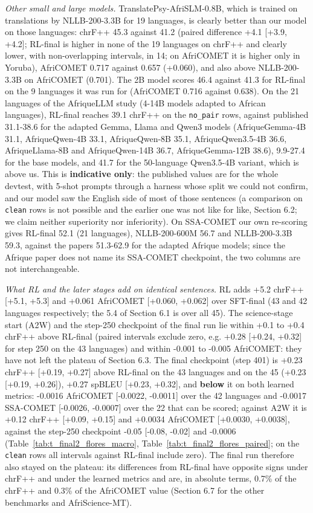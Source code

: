 \emph{Other small and large models.} TranslatePsy-AfriSLM-0.8B, which is trained on translations by NLLB-200-3.3B for 19 languages, is clearly better than our model on those languages: chrF++ 45.3 against 41.2 (paired difference +4.1 {[}+3.9, +4.2{]}; RL-final is higher in none of the 19 languages on chrF++ and clearly lower, with non-overlapping intervals, in 14; on AfriCOMET it is higher only in Yoruba), AfriCOMET 0.717 against 0.657 (+0.060), and also above NLLB-200-3.3B on AfriCOMET (0.701). The 2B model scores 46.4 against 41.3 for RL-final on the 9 languages it was run for (AfriCOMET 0.716 against 0.638). On the 21 languages of the AfriqueLLM study (4-14B models adapted to African languages), RL-final reaches 39.1 chrF++ on the \texttt{no\_pair} rows, against published 31.1-38.6 for the adapted Gemma, Llama and Qwen3 models (AfriqueGemma-4B 31.1, AfriqueQwen-4B 33.1, AfriqueQwen-8B 35.1, AfriqueQwen3.5-4B 36.6, AfriqueLlama-8B and AfriqueQwen-14B 36.7, AfriqueGemma-12B 38.6), 9.9-27.4 for the base models, and 41.7 for the 50-language Qwen3.5-4B variant, which is above us. This is \textbf{indicative only}: the published values are for the whole devtest, with 5-shot prompts through a harness whose split we could not confirm, and our model saw the English side of most of those sentences (a comparison on \texttt{clean} rows is not possible and the earlier one was not like for like, Section 6.2; we claim neither superiority nor inferiority). On SSA-COMET our own re-scoring gives RL-final 52.1 (21 languages), NLLB-200-600M 56.7 and NLLB-200-3.3B 59.3, against the papers\textquotesingle{} 51.3-62.9 for the adapted Afrique models; since the Afrique paper does not name its SSA-COMET checkpoint, the two columns are not interchangeable.

\emph{What RL and the later stages add on identical sentences.} RL adds +5.2 chrF++ {[}+5.1, +5.3{]} and +0.061 AfriCOMET {[}+0.060, +0.062{]} over SFT-final (43 and 42 languages respectively; the 5.4 of Section 6.1 is over all 45). The science-stage start (A2W) and the step-250 checkpoint of the final run lie within +0.1 to +0.4 chrF++ above RL-final (paired intervals exclude zero, e.g. +0.28 {[}+0.24, +0.32{]} for step 250 on the 43 languages) and within -0.001 to -0.005 AfriCOMET: they have not left the plateau of Section 6.3. The final checkpoint (step 401) is +0.23 chrF++ {[}+0.19, +0.27{]} above RL-final on the 43 languages and on the 45 (+0.23 {[}+0.19, +0.26{]}), +0.27 spBLEU {[}+0.23, +0.32{]}, and \textbf{below} it on both learned metrics: -0.0016 AfriCOMET {[}-0.0022, -0.0011{]} over the 42 languages and -0.0017 SSA-COMET {[}-0.0026, -0.0007{]} over the 22 that can be scored; against A2W it is +0.12 chrF++ {[}+0.09, +0.15{]} and +0.0034 AfriCOMET {[}+0.0030, +0.0038{]}, against the step-250 checkpoint -0.05 {[}-0.08, -0.02{]} and -0.0006 (Table~\ref{tab:t_final2_flores_macro}, Table~\ref{tab:t_final2_flores_paired}; on the \texttt{clean} rows all intervals against RL-final include zero). The final run therefore also stayed on the plateau: its differences from RL-final have opposite signs under chrF++ and under the learned metrics and are, in absolute terms, 0.7\% of the chrF++ and 0.3\% of the AfriCOMET value (Section 6.7 for the other benchmarks and AfriScience-MT).

